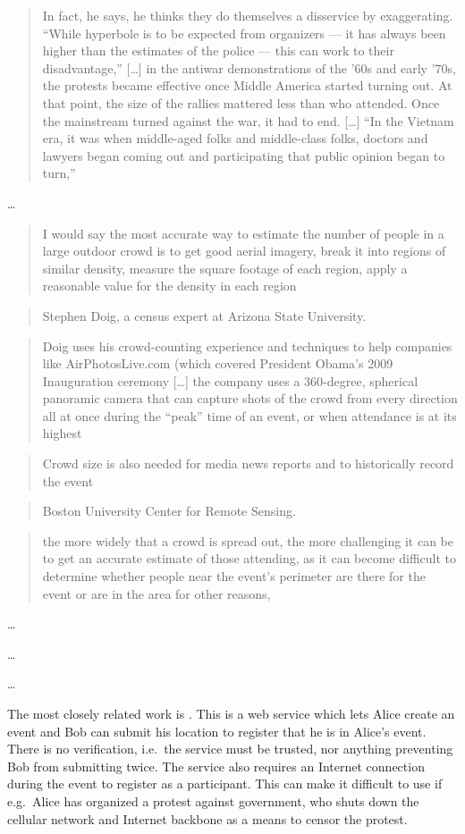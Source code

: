 \blockcquote{TheCrowdNumbersGame}{%
  In fact, he says, he thinks they do themselves a disservice by exaggerating. 
  “While hyperbole is to be expected from organizers — it has always been higher 
  than the estimates of the police — this can work to their disadvantage,”
  [\dots]
  in the antiwar demonstrations of the ’60s and early ’70s, the protests became 
  effective once Middle America started turning out. At that point, the size of 
  the rallies mattered less than who attended. Once the mainstream turned against 
  the war, it had to end.
  [\dots]
  “In the Vietnam era, it was when middle-aged folks and middle-class folks, 
  doctors and lawyers began coming out and participating that public opinion 
  began to turn,”%
}

\Textcite{HowToEstimateCrowdSize} \dots

\blockcquote[Interview with Stephen Doig, ASU]{HowToEstimateCrowdSize}{%
  I would say the most accurate way to estimate the number of people in a large 
  outdoor crowd is to get good aerial imagery, break it into regions of similar 
  density, measure the square footage of each region, apply a reasonable value 
  for the density in each region%
}
\blockcquote{HowToEstimateCrowdSize}{%
  Stephen Doig, a census expert at Arizona State University.%
}

\blockcquote{HowToEstimateCrowdSize}{%
  Doig uses his crowd-counting experience and techniques to help companies like 
  AirPhotosLive.com (which covered President Obama's 2009 Inauguration ceremony
  [\dots]
  the company uses a 360-degree, spherical panoramic camera that can capture 
  shots of the crowd from every direction all at once during the \enquote{peak} 
  time of an event, or when attendance is at its highest%
}

\blockcquote{HowToEstimateCrowdSize}{%
  Crowd size is also needed for media news reports and to historically record 
  the event%
}

\blockcquote{HowToEstimateCrowdSize}{%
  Boston University Center for Remote Sensing.%
}

\blockcquote{HowToEstimateCrowdSize}{%
  the more widely that a crowd is spread out, the more challenging it can be to 
  get an accurate estimate of those attending, as it can become difficult to 
  determine whether people near the event's perimeter are there for the event 
  or are in the area for other reasons,%
}

\Textcite{WifiCrowdCounting} \dots

\Textcite{CVCrowdCounting} \dots

\Textcite{NNCrowdCounting} \dots

The most closely related work is \textcite{CrowdCount.org}.
This is a web service which lets Alice create an event and Bob can submit his 
location to register that he is in Alice's event.
There is no verification, i.e.\ the service must be trusted, nor anything 
preventing Bob from submitting twice.
The service also requires an Internet connection during the event to register 
as a participant.
This can make it difficult to use if e.g.\ Alice has organized a protest 
against government, who shuts down the cellular network and Internet backbone 
as a means to censor the protest.
